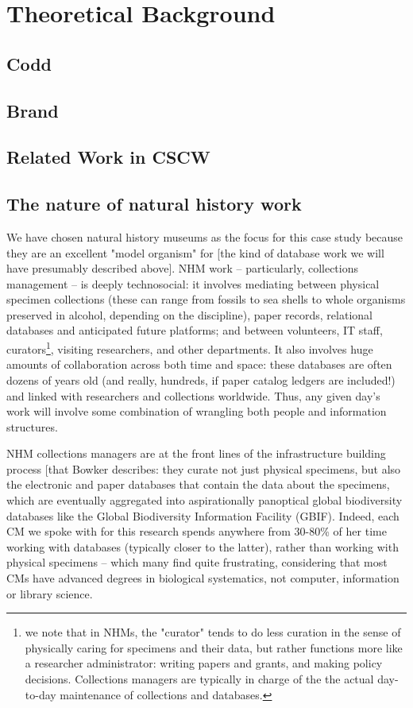 \section{Theoretical Background}

\subsection{Codd}

\subsection{Brand}

\subsection{Related Work in CSCW}


\subsection{The nature of natural history work}

We have chosen natural history museums as the focus for this case study because they are an excellent "model organism" for [the kind of database work we will have presumably described above]. NHM work -- particularly, collections management -- is deeply technosocial: it involves mediating between physical specimen collections (these can range from fossils to sea shells to whole organisms preserved in alcohol, depending on the discipline), paper records, relational databases and anticipated future platforms; and between volunteers, IT staff, curators\footnote{we note that in NHMs, the "curator" tends to do less curation in the sense of physically caring for specimens and their data, but rather functions more like a researcher administrator: writing papers and grants, and making policy decisions. Collections managers are typically in charge of the the actual day-to-day maintenance of collections and databases.}, visiting researchers, and other departments.  It also involves huge amounts of collaboration across both time and space: these databases are often dozens of years old (and really, hundreds, if paper catalog ledgers are included!) and linked with researchers and collections worldwide. Thus, any given day’s work will involve some combination of wrangling both people and information structures.

NHM collections managers are at the front lines of the infrastructure building process [that Bowker describes: they curate not just physical specimens, but also the electronic and paper databases that contain the data about the specimens, which are eventually aggregated into aspirationally panoptical global biodiversity databases like the Global Biodiversity Information Facility (GBIF).  Indeed, each CM we spoke with for this research spends anywhere from 30-80\% of her time working with databases (typically closer to the latter), rather than working with physical specimens – which many find quite frustrating, considering that most CMs have advanced degrees in biological systematics, not computer, information or library science.



